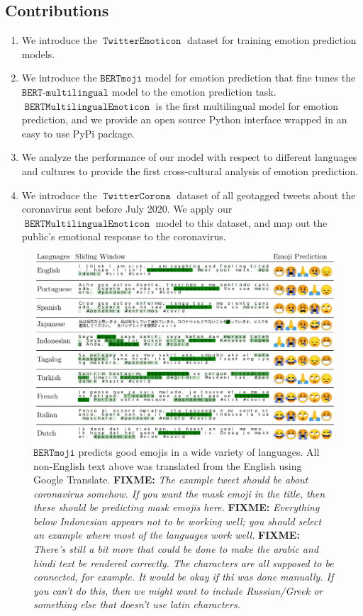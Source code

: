 \documentclass[11pt]{article}
\newcommand{\fixme}[1]{{\color{red} \textbf{FIXME:} {\textit {#1}}}}
\newcommand{\bertmoji}{\texttt{BERTmoji}}
\newcommand{\bert}{\texttt{BERT-multilingual}}
\DeclareMathOperator{\model}{\texttt{BERTMultilingualEmoticon}}
\DeclareMathOperator{\emoticon}{\texttt{TwitterEmoticon}}
\DeclareMathOperator{\corona}{\texttt{TwitterCorona}}
\begin{document}
{\color{blue} \lipsum[1-4] }

\subsection{Contributions}

\begin{enumerate}
    \item 
        We introduce the $\emoticon$ dataset for training emotion prediction models.
    \item
        We introduce the $\bertmoji$ model for emotion prediction that fine tunes the $\bert$ model \citep{devlin2018bert} to the emotion prediction task. 
        $\model$ is the first multilingual model for emotion prediction,
        and we provide an open source Python interface wrapped in an easy to use PyPi package.
    \item
        We analyze the performance of our model with respect to different languages and cultures to provide the first cross-cultural analysis of emotion prediction.
    \item 
        We introduce the $\corona$ dataset of all geotagged tweets about the coronavirus sent before July 2020.
        We apply our $\model$ model to this dataset,
        and map out the public's emotional response to the coronavirus.
\end{enumerate}

\begin{figure}
    \centering
    \includegraphics[width=\textwidth]{images/languages_slide_fix.pdf}
    \caption{
        $\bertmoji$ predicts good emojis in a wide variety of languages.
        All non-English text above was translated from the English using Google Translate.
        \fixme{The example tweet should be about coronavirus somehow. If you want the mask emoji in the title, then these should be predicting mask emojis here.}
        \fixme{Everything below Indonesian appears not to be working well; you should select an example where most of the languages work well.}
        \fixme{There's still a bit more that could be done to make the arabic and hindi text be rendered correctly.  The characters are all supposed to be connected, for example.  It would be okay if thi was done manually.  If you can't do this, then we might want to include Russian/Greek or something else that doesn't use latin characters.}
     }
    \label{fig:prediction_top10_langs}
\end{figure}
\end{document}
